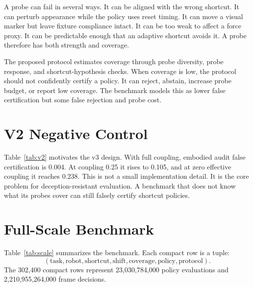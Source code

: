 \documentclass{article}
\begin{document}
A probe can fail in several ways. It can be aligned with the wrong shortcut. It can perturb appearance while the policy uses reset timing. It can move a visual marker but leave fixture compliance intact. It can be too weak to affect a force proxy. It can be predictable enough that an adaptive shortcut avoids it. A probe therefore has both strength and coverage.

The proposed protocol estimates coverage through probe diversity, probe response, and shortcut-hypothesis checks. When coverage is low, the protocol should not confidently certify a policy. It can reject, abstain, increase probe budget, or report low coverage. The benchmark models this as lower false certification but some false rejection and probe cost.

\section{V2 Negative Control}

\begin{table}[t]
\centering
\small

\caption{V2 probe-coupling stress. A single embodied audit works when coupling is high, but false certification returns when the probe does not disrupt the shortcut channel.}
\label{tab:v2}
\end{table}

Table~\ref{tab:v2} motivates the v3 design. With full coupling, embodied audit false certification is 0.004. At coupling 0.25 it rises to 0.105, and at zero effective coupling it reaches 0.238. This is not a small implementation detail. It is the core problem for deception-resistant evaluation. A benchmark that does not know what its probes cover can still falsely certify shortcut policies.

\section{Full-Scale Benchmark}

\begin{table}[t]
\centering
\small

\caption{Full-scale benchmark factors. Compact rows represent seeds, policy instances, physical probe variants, deployment replicates, trials, and control frames.}
\label{tab:scale}
\end{table}

Table~\ref{tab:scale} summarizes the benchmark. Each compact row is a tuple:
\[
(\mathrm{task},\mathrm{robot},\mathrm{shortcut},\mathrm{shift},\mathrm{coverage},\mathrm{policy},\mathrm{protocol}).
\]
The 302,400 compact rows represent 23,030,784,000 policy evaluations and 2,210,955,264,000 frame decisions.
\end{document}
